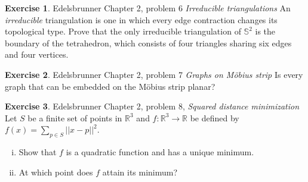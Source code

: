 \documentclass[12pt]{article}
\theoremstyle{definition}
\newtheorem{exercise}{Exercise}
\begin{document}
\begin{exercise} Edelsbrunner Chapter 2, problem 6 \textit{Irreducible triangulations}\newline
	An \textit{irreducible} triangulation is one in which every edge contraction changes its topological type. Prove that the only irreducible triangulation of $\mathbb{S}^2$ is the boundary of the tetrahedron, which consists of four triangles sharing six edges and four vertices. 
\end{exercise}

\begin{exercise} Edelsbrunner Chapter 2, problem 7 \textit{Graphs on M\"obius strip}\newline
	Is every graph that can be embedded on the M\"obius strip planar?
\end{exercise}

\begin{exercise} Edelsbrunner Chapter 2, problem 8, \textit{Squared distance minimization}\newline
	Let $S$ be a finite set of points in $\mathbb{R}^3$ and $f:\mathbb{R}^3\to\mathbb{R}$ be defined by $f(x)=\sum_{p\in S} ||x-p||^2$.
	\begin{enumerate}[(i)]
		\item Show that $f$ is a quadratic function and has a unique minimum.
		\item At which point does $f$ attain its minimum?
	\end{enumerate}
\end{exercise}
\end{document}
